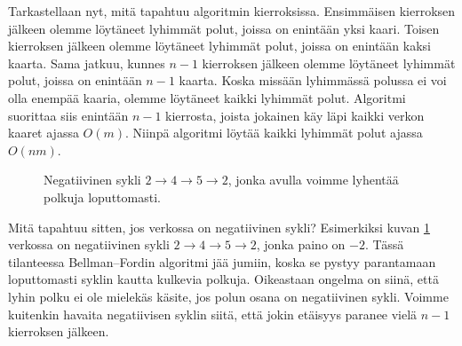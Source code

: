 Tarkastellaan nyt, mitä tapahtuu algoritmin kierroksissa.
Ensimmäisen kierroksen jälkeen olemme löytäneet lyhimmät polut,
joissa on enintään yksi kaari.
Toisen kierroksen jälkeen olemme löytäneet lyhimmät polut,
joissa on enintään kaksi kaarta.
Sama jatkuu, kunnes $n-1$ kierroksen jälkeen olemme löytäneet
lyhimmät polut, joissa on enintään $n-1$ kaarta.
Koska missään lyhimmässä polussa ei voi olla enempää kaaria,
olemme löytäneet kaikki lyhimmät polut.
Algoritmi suorittaa siis enintään $n-1$ kierrosta,
joista jokainen käy läpi kaikki verkon kaaret ajassa $O(m)$.
Niinpä algoritmi löytää kaikki lyhimmät polut ajassa $O(nm)$.

\begin{figure}
\center
\begin{center}
\end{center}
\caption{Negatiivinen sykli $2 \rightarrow 4 \rightarrow 5 \rightarrow 2$,
jonka avulla voimme lyhentää polkuja loputtomasti.}
\label{fig:belsyk}
\end{figure}

Mitä tapahtuu sitten, jos verkossa on negatiivinen sykli?
Esimerkiksi kuvan \ref{fig:belsyk} verkossa on negatiivinen sykli
$2 \rightarrow 4 \rightarrow 5 \rightarrow 2$, jonka paino on $-2$.
Tässä tilanteessa Bellman–Fordin algoritmi jää jumiin, koska se pystyy parantamaan
loputtomasti syklin kautta kulkevia polkuja.
Oikeastaan ongelma on siinä, että lyhin polku ei ole mielekäs käsite,
jos polun osana on negatiivinen sykli.
Voimme kuitenkin havaita negatiivisen syklin siitä,
että jokin etäisyys paranee vielä $n-1$ kierroksen jälkeen.

